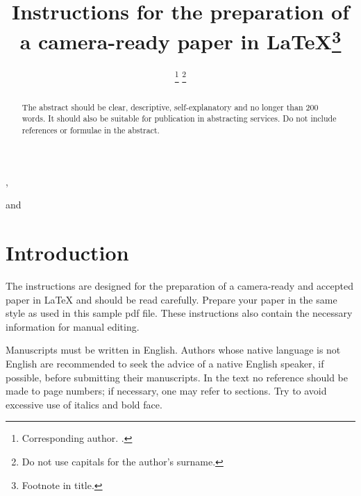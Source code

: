 \documentclass[bsi]{iosart2x}
\begin{document}
\begin{frontmatter} %

%
\title{Instructions for the preparation of a camera-ready paper in \LaTeX\thanks{Footnote in title.}}



\author[A]{ %
\thanks{Corresponding author. .}%
\thanks{Do not use capitals for the author's surname.}},
\author[B]{ }
and
\author[B]{ }
\address[A]{Journal Production Department, , Nieuwe Hemweg 6b, 1013 BG, Amsterdam, }
\address[B]{Department first, ,
Abbreviate US states, }

\begin{abstract}
The abstract should be clear, descriptive, self-explanatory and no longer than 200 words. It should also
be suitable for publication in abstracting services. Do not include references or formulae in the abstract.
\end{abstract}

\begin{keyword}
\end{keyword}
\end{frontmatter}




\section{Introduction}

The instructions are designed for the preparation of a camera-ready and accepted paper in \LaTeX{} and should be read carefully.
Prepare your paper in the same style as used in this sample pdf file.
These instructions also contain the necessary information for manual editing.

Manuscripts must be written in English. Authors whose native language is not English are recommended to seek the advice of a native English speaker,
if possible, before submitting their manuscripts. In the text no reference should be made
to page numbers; if necessary, one may refer to sections. Try to avoid excessive use of italics and bold face.
\end{document}
